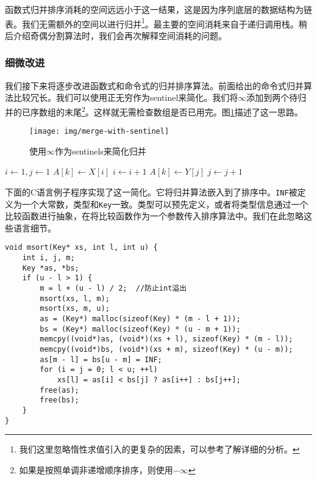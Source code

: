\documentclass{ctexart}
\begin{document}
函数式归并排序消耗的空间远远小于这一结果，这是因为序列底层的数据结构为链表。我们无需额外的空间以进行归并\footnote{我们这里忽略惰性求值引入的更复杂的因素，可以参考\cite{algo-fp}了解详细的分析。}。最主要的空间消耗来自于递归调用栈。稍后介绍奇偶分割算法时，我们会再次解释空间消耗的问题。

\subsubsection{细微改进}

我们接下来将逐步改进函数式和命令式的归并排序算法。前面给出的命令式归并算法比较冗长。我们可以使用正无穷作为sentinel来简化\cite{CLRS}。我们将$\infty$添加到两个待归并的已序数组的末尾\footnote{如果是按照单调非递增顺序排序，则使用$-\infty$}。这样就无需检查数组是否已用完。图\ref{fig:merge-with-sentinel}描述了这一思路。

\begin{figure}[htbp]
 \centering
 \texttt{[image: img/merge-with-sentinel]}
 \caption{使用$\infty$作为sentinels来简化归并}
 \label{fig:merge-with-sentinel}
\end{figure}

\begin{algorithmic}[1]
  \State {}
  \State {}
  \State $i \gets 1, j\gets 1$
      \State $A[k] \gets X[i]$
      \State $i \gets i + 1$
    \Else
      \State $A[k] \gets Y[j]$
      \State $j \gets j + 1$
    \EndIf
  \EndFor
\EndProcedure
\end{algorithmic}

下面的C语言例子程序实现了这一简化。它将归并算法嵌入到了排序中。\texttt{INF}被定义为一个大常数，类型和\texttt{Key}一致。类型可以预先定义，或者将类型信息通过一个比较函数进行抽象，在将比较函数作为一个参数传入排序算法中。我们在此忽略这些语言细节。

\lstset{language=C}
\begin{lstlisting}
void msort(Key* xs, int l, int u) {
    int i, j, m;
    Key *as, *bs;
    if (u - l > 1) {
        m = l + (u - l) / 2;  //防止int溢出
        msort(xs, l, m);
        msort(xs, m, u);
        as = (Key*) malloc(sizeof(Key) * (m - l + 1));
        bs = (Key*) malloc(sizeof(Key) * (u - m + 1));
        memcpy((void*)as, (void*)(xs + l), sizeof(Key) * (m - l));
        memcpy((void*)bs, (void*)(xs + m), sizeof(Key) * (u - m));
        as[m - l] = bs[u - m] = INF;
        for (i = j = 0; l < u; ++l)
            xs[l] = as[i] < bs[j] ? as[i++] : bs[j++];
        free(as);
        free(bs);
    }
}
\end{lstlisting}
\end{document}
